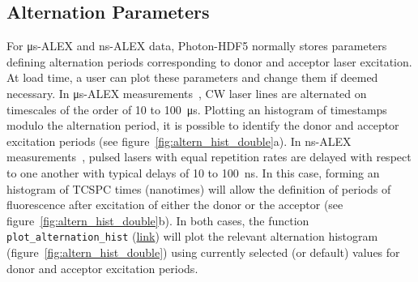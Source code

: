 \documentclass[10pt,letterpaper]{article}
\begin{document}
\subsection*{Alternation Parameters}
\label{sec:alternation}

For μs-ALEX and ns-ALEX data, Photon-HDF5 normally stores parameters defining
alternation periods corresponding to donor and acceptor laser excitation.
At load time, a user can plot these parameters and change them if deemed necessary.
In μs-ALEX measurements~\cite{Kapanidis_2004},
CW laser lines are alternated on timescales of the order of 10 to 100~μs.
Plotting an histogram of timestamps modulo the alternation period, it
is possible to identify the donor and acceptor excitation periods (see figure~\ref{fig:altern_hist_double}a).
In ns-ALEX measurements~\cite{Laurence_2005},
pulsed lasers with equal repetition rates are delayed with respect
to one another with typical delays of 10 to 100~ns.
In this case, forming an histogram of TCSPC times (nanotimes) will allow
the definition of periods of fluorescence after excitation
of either the donor or the acceptor (see figure~\ref{fig:altern_hist_double}b).
In both cases, the function
\verb|plot_alternation_hist|
(\href{http://fretbursts.readthedocs.org/en/latest/plots.html#fretbursts.burst_plot.plot_alternation_hist}{link})
will plot the relevant alternation histogram (figure~\ref{fig:altern_hist_double})
using currently selected (or default) values for donor and acceptor excitation periods.
\end{document}
